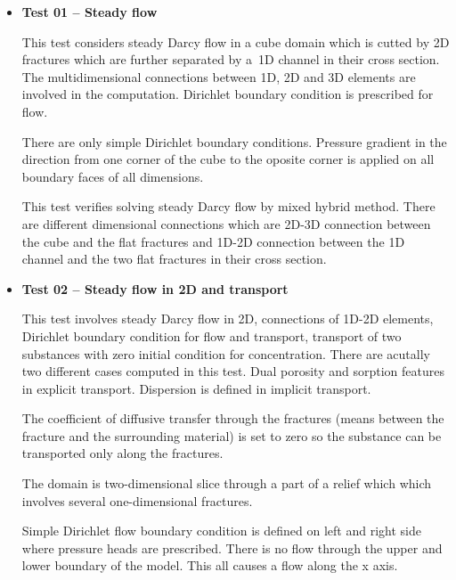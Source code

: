 \documentclass[12pt,a4paper]{report}
\begin{document}
\begin{itemize}

\item \textbf{Test 01 -- Steady flow}

This test considers steady Darcy flow in a cube domain which is cutted by 2D fractures which are further separated by a~1D channel in their cross section. The multidimensional connections between 1D, 2D and 3D elements are involved in the computation. Dirichlet boundary condition is prescribed for flow.

There are only simple Dirichlet boundary conditions. Pressure gradient in the direction from one corner of the cube to the oposite corner is applied on all boundary faces of all dimensions.

This test verifies solving steady Darcy flow by mixed hybrid method. There are different dimensional connections which are 2D-3D connection between the cube and the flat fractures and 1D-2D connection between the 1D channel and the two flat fractures in their cross section.



\item \textbf{Test 02 -- Steady flow in 2D and transport}

This test involves steady Darcy flow in 2D, connections of 1D-2D elements, Dirichlet boundary condition for flow and transport, transport of two substances with zero initial condition for concentration. 
There are acutally two different cases computed in this test. Dual porosity and sorption features in explicit transport. Dispersion is defined in implicit transport.

The coefficient of diffusive transfer through the fractures (means between the fracture and the surrounding material) is set to zero so the substance can be transported only along the fractures.

The domain is two-dimensional slice through a part of a relief which which involves several one-dimensional fractures.

Simple Dirichlet flow boundary condition is defined on left and right side where pressure heads are prescribed. There is no flow through the upper and lower boundary of the model. This all causes a flow along the x axis.


\end{itemize}
\end{document}
